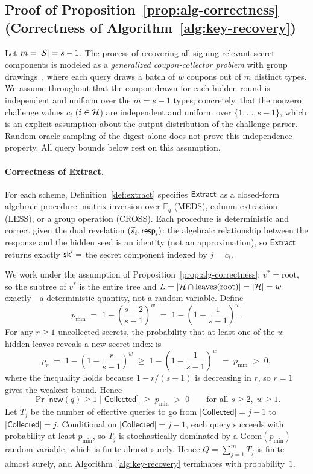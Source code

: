 \subsection{Proof of Proposition~\ref{prop:alg-correctness}
  (Correctness of Algorithm~\ref{alg:key-recovery})}
\label{app:proof-recovery}

Let $m = |\mathcal{S}| = s - 1$. The process of recovering all signing-relevant secret
components is modeled as a \emph{generalized coupon-collector problem}
with group drawings~\cite{coupon1,AnceaumeBSS16}, where each query
draws a batch of $w$ coupons out of $m$ distinct types. We assume
throughout that the coupon drawn for each hidden round is independent and
uniform over the $m = s-1$ types; concretely, that the nonzero challenge values
$c_i$ ($i\in\mathcal{H}$) are independent and uniform over $\{1,\ldots,s-1\}$, which is an explicit assumption about the output distribution of the
challenge parser. Random-oracle sampling of the digest alone does not prove
this independence property. All query
bounds below rest on this assumption.

\paragraph{Correctness of Extract.}
For each scheme, Definition~\ref{def:extract} specifies $\mathsf{Extract}$ as a closed-form
algebraic procedure: matrix inversion over $\mathbb{F}_q$ (MEDS), column extraction
(LESS), or a group operation (CROSS).
Each procedure is deterministic and correct given the dual revelation
$(\widetilde{s}_i, \mathsf{resp}_i)$: the algebraic relationship between the response and the
hidden seed is an identity (not an approximation), so $\mathsf{Extract}$ returns exactly
$\mathsf{sk}' = $ the secret component indexed by $j = c_i$.

We work under the assumption of Proposition~\ref{prop:alg-correctness}:
$v^* = \mathrm{root}$, so the subtree of $v^*$ is the entire tree and
$L = |\mathcal{H} \cap \mathrm{leaves}(\mathrm{root})| = |\mathcal{H}| = w$
exactly---a deterministic quantity, not a random variable.
Define
\[
  p_{\min}
  \;=\; 1 - \left(\frac{s-2}{s-1}\right)^{\!w}
  \;=\; 1 - \left(1 - \frac{1}{s-1}\right)^{\!w}.
\]
For any $r \geq 1$ uncollected secrets, the probability that at least one of
the $w$ hidden leaves reveals a new secret index is
\[
  p_r
  \;=\; 1 - \left(1 - \frac{r}{s-1}\right)^{\!w}
  \;\geq\; 1 - \left(1 - \frac{1}{s-1}\right)^{\!w}
  \;=\; p_{\min}
  \;>\; 0,
\]
where the inequality holds because $1 - r/(s-1)$ is decreasing in $r$, so
$r = 1$ gives the weakest bound.  Hence
\[
  \Pr\bigl[\mathsf{new}(q) \geq 1 \;\big|\; \mathsf{Collected}\bigr]
  \;\geq\; p_{\min} \;>\; 0
  \qquad \text{for all } s \geq 2,\; w \geq 1.
\]
Let $T_j$ be the number of effective queries to go from
$|\mathsf{Collected}| = j-1$ to $|\mathsf{Collected}| = j$.
Conditional on $|\mathsf{Collected}| = j-1$, each query succeeds with
probability at least $p_{\min}$, so $T_j$ is stochastically dominated by
a $\mathrm{Geom}(p_{\min})$ random variable, which is finite almost
surely.  Hence $Q = \sum_{j=1}^{m} T_j$ is finite almost surely, and
Algorithm~\ref{alg:key-recovery} terminates with probability~$1$.

